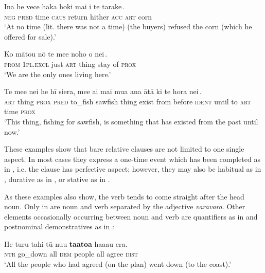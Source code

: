 \ea\label{ex:11.130}
\gll {\ꞌ}Ina he vece {\ob}haka hoki mai i te tarake\,{\cb}. \\
\textsc{neg} \textsc{pred} time {\db}\textsc{caus} return hither \textsc{acc} \textsc{art} corn \\

\glt 
‘At no time (lit. there was not a time) (the buyers) refused the corn (which he offered for sale).’ \textstyleExampleref{[R250.080]} 
\z

\ea\label{ex:11.131}
\gll Ko mātou nō te me{\ꞌ}e {\ob}noho o nei\,{\cb}. \\
\textsc{prom} \textsc{1pl.excl} just \textsc{art} thing {\db}stay of \textsc{prox} \\

\glt 
‘We are the only ones living here.’ \textstyleExampleref{[R404.050]} 
\z

\ea\label{ex:11.132}
\gll Te me{\ꞌ}e nei he hī siera, me{\ꞌ}e {\ob}ai mai mu{\ꞌ}a {\ꞌ}ana  {\ꞌ}ātā ki te hora nei\,{\cb}.\\
\textsc{art} thing \textsc{prox} \textsc{pred} to\_fish sawfish thing {\db}exist from before \textsc{ident}  until to \textsc{art} time \textsc{prox}\\

\glt
‘This thing, fishing for sawfish, is something that has existed from the past until now.’ \textstyleExampleref{[R364.001]} 
\z

These examples show that bare relative clauses are not limited to one single aspect. In most cases they express a one-time event which has been completed as in , i.e. the clause has perfective aspect; however, they may also be habitual as in , durative as in , or stative as in .

As these examples also show, the verb tends to come straight after the head noun. Only in  are noun and verb separated by the adjective \textit{varavara}. Other elements occasionally occurring between noun and verb are quantifiers as in  and postnominal demonstratives as in :

\ea\label{ex:11.133}
\gll He turu tahi tū nu{\ꞌ}u \textbf{ta{\ꞌ}ato{\ꞌ}a} ha{\ꞌ}aau era. \\
\textsc{ntr} go\_down all \textsc{dem} people all agree \textsc{dist} \\

\glt 
‘All the people who had agreed (on the plan) went down (to the coast).’ \textstyleExampleref{[R250.233]} 
\z

